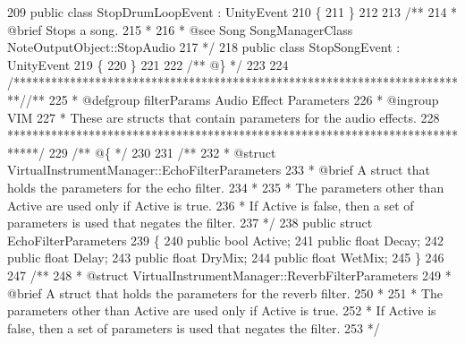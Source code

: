 \begin{DoxyCodeInclude}
209     \textcolor{keyword}{public} \textcolor{keyword}{class }StopDrumLoopEvent : UnityEvent
210     \{
211     \}
212 \textcolor{comment}{}
213 \textcolor{comment}{    /** }
214 \textcolor{comment}{     * @brief Stops a song.}
215 \textcolor{comment}{     * }
216 \textcolor{comment}{     * @see Song SongManagerClass NoteOutputObject::StopAudio}
217 \textcolor{comment}{    */}
218     \textcolor{keyword}{public} \textcolor{keyword}{class }StopSongEvent : UnityEvent
219     \{
220     \}
221 \textcolor{comment}{}
222 \textcolor{comment}{    /** @\} */}
223 
224     \textcolor{comment}{/*************************************************************************/}\textcolor{comment}{/** }
225 \textcolor{comment}{    * @defgroup filterParams Audio Effect Parameters}
226 \textcolor{comment}{    * @ingroup VIM}
227 \textcolor{comment}{    * These are structs that contain parameters for the audio effects.}
228 \textcolor{comment}{    *****************************************************************************/}\textcolor{comment}{}
229 \textcolor{comment}{    /** @\{ */}
230 \textcolor{comment}{}
231 \textcolor{comment}{    /** }
232 \textcolor{comment}{     * @struct VirtualInstrumentManager::EchoFilterParameters}
233 \textcolor{comment}{     * @brief A struct that holds the parameters for the echo filter.}
234 \textcolor{comment}{     * }
235 \textcolor{comment}{     * The parameters other than Active are used only if Active is true.}
236 \textcolor{comment}{     * If Active is false, then a set of parameters is used that negates the filter.}
237 \textcolor{comment}{    */}
238     \textcolor{keyword}{public} \textcolor{keyword}{struct }EchoFilterParameters
239     \{
240         \textcolor{keyword}{public} \textcolor{keywordtype}{bool} Active;
241         \textcolor{keyword}{public} \textcolor{keywordtype}{float} Decay;
242         \textcolor{keyword}{public} \textcolor{keywordtype}{float} Delay;
243         \textcolor{keyword}{public} \textcolor{keywordtype}{float} DryMix;
244         \textcolor{keyword}{public} \textcolor{keywordtype}{float} WetMix;
245     \}
246 \textcolor{comment}{}
247 \textcolor{comment}{    /** }
248 \textcolor{comment}{     * @struct VirtualInstrumentManager::ReverbFilterParameters}
249 \textcolor{comment}{     * @brief A struct that holds the parameters for the reverb filter.}
250 \textcolor{comment}{     * }
251 \textcolor{comment}{     * The parameters other than Active are used only if Active is true.}
252 \textcolor{comment}{     * If Active is false, then a set of parameters is used that negates the filter.}
253 \textcolor{comment}{    */}

\end{DoxyCodeInclude}

